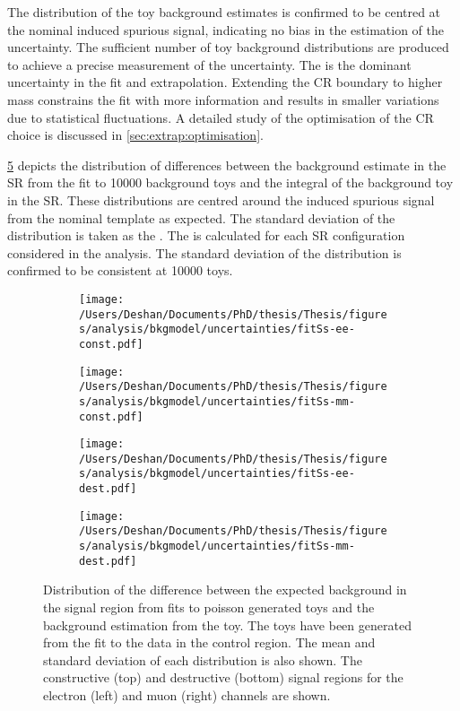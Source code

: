 The distribution of the toy background estimates is confirmed to be centred at the nominal induced spurious signal, indicating no bias in the estimation of the uncertainty. The sufficient number of toy background distributions are produced to achieve a precise measurement of the uncertainty. The \STATU is the dominant uncertainty in the fit and extrapolation. Extending the CR boundary to higher mass constrains the fit with more information and results in smaller variations due to statistical fluctuations. A detailed study of the optimisation of the CR choice is discussed in \cref{sec:extrap:optimisation}.

\cref{fig:bkgmodel:toyss} depicts the distribution of differences between the background estimate in the SR from the fit to 10000 background toys and the integral of the background toy in the SR. These distributions are centred around the induced spurious signal from the nominal template as expected. The standard deviation of the distribution is taken as the \STATU. The \ISSU is calculated for each SR configuration considered in the analysis. The standard deviation of the distribution is confirmed to be consistent at 10000 toys. 

\begin{figure}[h!]
    \centering
    \begin{subfigure}[b]{0.49\textwidth}
        \centering
        \texttt{[image: /Users/Deshan/Documents/PhD/thesis/Thesis/figures/analysis/bkgmodel/uncertainties/fitSs-ee-const.pdf]}
        \label{fig:bkgmodel:toyss1}
    \end{subfigure}
    \begin{subfigure}[b]{0.49\textwidth}
        \centering
        \texttt{[image: /Users/Deshan/Documents/PhD/thesis/Thesis/figures/analysis/bkgmodel/uncertainties/fitSs-mm-const.pdf]}
        \label{fig:bkgmodel:toyss2}
    \end{subfigure}
    \begin{subfigure}[b]{0.49\textwidth}
        \centering
        \texttt{[image: /Users/Deshan/Documents/PhD/thesis/Thesis/figures/analysis/bkgmodel/uncertainties/fitSs-ee-dest.pdf]}
        \label{fig:bkgmodel:toyss3}
    \end{subfigure}
    \begin{subfigure}[b]{0.49\textwidth}
        \centering
        \texttt{[image: /Users/Deshan/Documents/PhD/thesis/Thesis/figures/analysis/bkgmodel/uncertainties/fitSs-mm-dest.pdf]}
        \label{fig:bkgmodel:toyss4}
    \end{subfigure}
    \caption[Distributions of extrapolation from fit to poisson distributed toys generated in the control region]{Distribution of the difference between the expected background in the signal region from fits to poisson generated toys and the background estimation from the toy. The toys have been generated from the fit to the data in the control region. The mean and standard deviation of each distribution is also shown. The constructive (top) and destructive (bottom) signal regions for the electron (left) and muon (right) channels are shown.}
    \label{fig:bkgmodel:toyss}
\end{figure}

